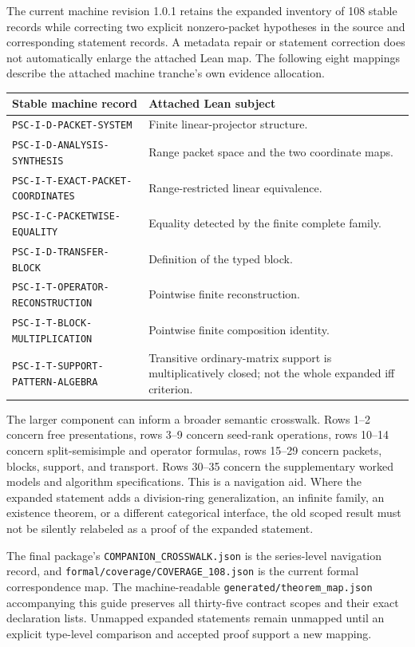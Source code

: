 \documentclass[11pt,a4paper]{article}
\newcommand{\code}[1]{\nolinkurl{#1}}
\begin{document}
The current machine revision 1.0.1 retains the expanded inventory of 108 stable records while correcting two explicit nonzero-packet hypotheses in the source and corresponding statement records. A metadata repair or statement correction does not automatically enlarge the attached Lean map. The following eight mappings describe the attached machine tranche's own evidence allocation.

\begin{longtable}{p{}p{}}
\toprule Stable machine record & Attached Lean subject \\\midrule\endhead
\code{PSC-I-D-PACKET-SYSTEM} & Finite linear-projector structure. \\
\code{PSC-I-D-ANALYSIS-SYNTHESIS} & Range packet space and the two coordinate maps. \\
\code{PSC-I-T-EXACT-PACKET-COORDINATES} & Range-restricted linear equivalence. \\
\code{PSC-I-C-PACKETWISE-EQUALITY} & Equality detected by the finite complete family. \\
\code{PSC-I-D-TRANSFER-BLOCK} & Definition of the typed block. \\
\code{PSC-I-T-OPERATOR-RECONSTRUCTION} & Pointwise finite reconstruction. \\
\code{PSC-I-T-BLOCK-MULTIPLICATION} & Pointwise finite composition identity. \\
\code{PSC-I-T-SUPPORT-PATTERN-ALGEBRA} & Transitive ordinary-matrix support is multiplicatively closed; not the whole expanded iff criterion. \\
\bottomrule
\end{longtable}

The larger component can inform a broader semantic crosswalk. Rows 1--2 concern free presentations, rows 3--9 concern seed-rank operations, rows 10--14 concern split-semisimple and operator formulas, rows 15--29 concern packets, blocks, support, and transport. Rows 30--35 concern the supplementary worked models and algorithm specifications. This is a navigation aid. Where the expanded statement adds a division-ring generalization, an infinite family, an existence theorem, or a different categorical interface, the old scoped result must not be silently relabeled as a proof of the expanded statement.

The final package's \code{COMPANION_CROSSWALK.json} is the series-level navigation record, and \code{formal/coverage/COVERAGE_108.json} is the current formal correspondence map. The machine-readable \code{generated/theorem_map.json} accompanying this guide preserves all thirty-five contract scopes and their exact declaration lists. Unmapped expanded statements remain unmapped until an explicit type-level comparison and accepted proof support a new mapping.
\end{document}
